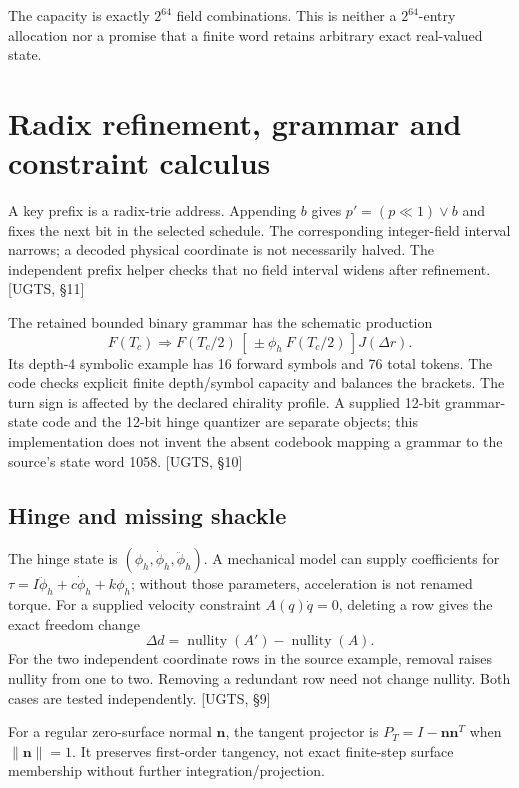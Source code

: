\documentclass[11pt,a4paper]{article}
\newcommand{\uRef}[1]{\textcolor{muted}{[UGTS, #1]}}
\begin{document}
The capacity is exactly $2^{64}$ field combinations. This is neither a $2^{64}$-entry allocation nor a promise
that a finite word retains arbitrary exact real-valued state.
\clearpage

\section{Radix refinement, grammar and constraint calculus}
A key prefix is a radix-trie address. Appending $b$ gives $p'=(p\ll1)\lor b$ and fixes the next bit in the
selected schedule. The corresponding integer-field interval narrows; a decoded physical coordinate is not
necessarily halved. The independent prefix helper checks that no field interval widens after refinement.
\uRef{\S11}

The retained bounded binary grammar has the schematic production
\begin{equation}
F(T_c)\Rightarrow F(T_c/2)\,[\,\pm\phi_h\ F(T_c/2)\,]J(\Delta r).
\end{equation}
Its depth-4 symbolic example has 16 forward symbols and 76 total tokens. The code checks explicit finite
depth/symbol capacity and balances the brackets. The turn sign is affected by the declared chirality profile.
A supplied 12-bit grammar-state code and the 12-bit hinge quantizer are separate objects; this implementation
does not invent the absent codebook mapping a grammar to the source's state word 1058. \uRef{\S10}

\subsection{Hinge and missing shackle}
The hinge state is $(\phi_h,\dot\phi_h,\ddot\phi_h)$. A mechanical model can supply coefficients for
$\tau=I\ddot\phi_h+c\dot\phi_h+k\phi_h$; without those parameters, acceleration is not renamed torque.
For a supplied velocity constraint $A(q)\dot q=0$, deleting a row gives the exact freedom change
\begin{equation}
\Delta d=\operatorname{nullity}(A')-\operatorname{nullity}(A).
\end{equation}
For the two independent coordinate rows in the source example, removal raises nullity from one to two.
Removing a redundant row need not change nullity. Both cases are tested independently. \uRef{\S9}

For a regular zero-surface normal $\mathbf n$, the tangent projector is
$P_T=I-\mathbf n\mathbf n^T$ when $\|\mathbf n\|=1$. It preserves first-order tangency, not exact finite-step
surface membership without further integration/projection.
\end{document}
